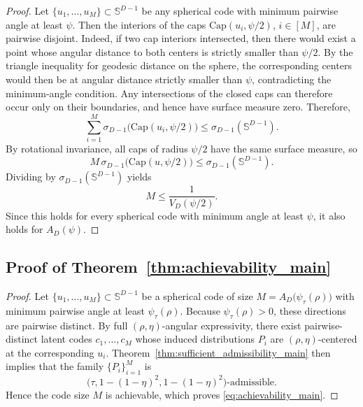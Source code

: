 \documentclass[journal]{IEEEtran}
\begin{document}
\begin{bibunit}
\begin{proof}
%
Let $\{u_1,\ldots,u_M\}\subset\mathbb{S}^{D-1}$ be any spherical code with minimum pairwise angle at least $\psi$. Then the interiors of the caps $\mathrm{Cap}(u_i,\psi/2)$, $i\in[M]$, are pairwise disjoint. Indeed, if two cap interiors intersected, then there would exist a point whose angular distance to both centers is strictly smaller than $\psi/2$. By the triangle inequality for geodesic distance on the sphere, the corresponding centers would then be at angular distance strictly smaller than $\psi$, contradicting the minimum-angle condition. Any intersections of the closed caps can therefore occur only on their boundaries, and hence have surface measure zero.
%
Therefore,
%
\begin{equation}
\sum_{i=1}^M \sigma_{D-1}\bigl(\mathrm{Cap}(u_i,\psi/2)\bigr)
\le \sigma_{D-1}(\mathbb{S}^{D-1}).
\end{equation}
%
By rotational invariance, all caps of radius $\psi/2$ have the same surface measure, so
%
\begin{equation}
M\,\sigma_{D-1}\bigl(\mathrm{Cap}(u,\psi/2)\bigr)
\le \sigma_{D-1}(\mathbb{S}^{D-1}).
\end{equation}
%
Dividing by $\sigma_{D-1}(\mathbb{S}^{D-1})$ yields
%
\begin{equation}
M\le \frac{1}{V_D(\psi/2)}.
\end{equation}
%
Since this holds for every spherical code with minimum angle at least $\psi$, it also holds for $A_D(\psi)$.
%
\end{proof}





\subsection{Proof of Theorem~\ref{thm:achievability_main}}
\label{app:proof_thm_achievability}

\begin{proof}
%
Let $\{u_1,\ldots,u_M\}\subset\mathbb{S}^{D-1}$ be a spherical code of size $M= A_D\bigl(\psi_\tau(\rho)\bigr)$ with minimum pairwise angle at least $\psi_\tau(\rho)$. Because $\psi_\tau(\rho)>0$, these directions are pairwise distinct. By full $(\rho,\eta)$-angular expressivity, there exist pairwise-distinct latent codes $c_1,\ldots,c_M$ whose induced distributions $P_i$ are $(\rho,\eta)$-centered at the corresponding $u_i$. Theorem~\ref{thm:sufficient_admissibility_main} then implies that the family $\{P_i\}_{i=1}^M$ is
\[
\bigl(\tau,1-(1-\eta)^2,1-(1-\eta)^2\bigr)\text{-admissible}.
\]
Hence the code size $M$ is achievable, which proves \eqref{eq:achievability_main}.
%
\end{proof}







\end{bibunit}
\end{document}
